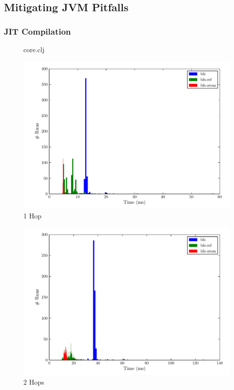 \documentclass[12pt,letterpaper,oneside,notitlepage]{report}
\theoremstyle{definition}
\begin{document}
			\subsection{Mitigating JVM Pitfalls}
				\subsubsection{JIT Compilation}
					\begin{figure}[ht!]
			
						\caption{core.clj}
					\end{figure}
		
		\begin{figure}[!ht]
			\centering
			\includegraphics[scale=0.85]{1_hops}
			\caption{1 Hop}
			\label{fig:perf-1-hop}
		\end{figure}
		
		\begin{figure}[!ht]
			\centering
			\includegraphics[scale=0.85]{2_hops}
			\caption{2 Hops}
			\label{fig:perf-2-hops}
		\end{figure}
		
\end{document}

